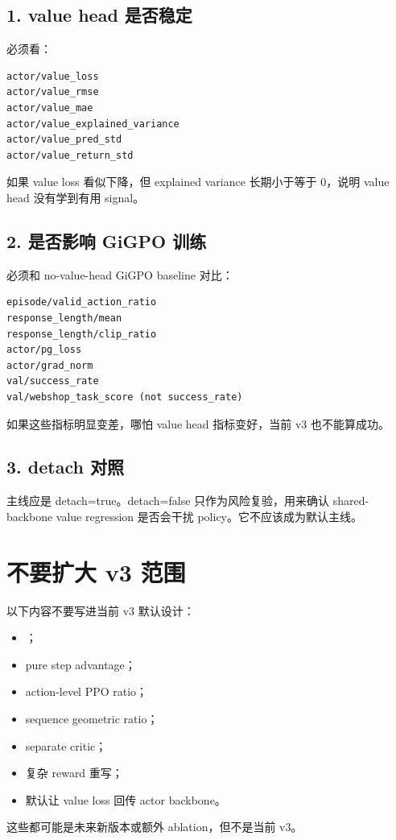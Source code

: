 \documentclass[10pt]{ctexart}
\begin{document}
\subsection*{1. value head 是否稳定}
必须看：
\begin{lstlisting}
actor/value_loss
actor/value_rmse
actor/value_mae
actor/value_explained_variance
actor/value_pred_std
actor/value_return_std
\end{lstlisting}

如果 value loss 看似下降，但 explained variance 长期小于等于 0，说明 value head 没有学到有用 signal。

\subsection*{2. 是否影响 GiGPO 训练}
必须和 no-value-head GiGPO baseline 对比：
\begin{lstlisting}
episode/valid_action_ratio
response_length/mean
response_length/clip_ratio
actor/pg_loss
actor/grad_norm
val/success_rate
val/webshop_task_score (not success_rate)
\end{lstlisting}

如果这些指标明显变差，哪怕 value head 指标变好，当前 v3 也不能算成功。

\subsection*{3. detach 对照}
主线应是 detach=true。detach=false 只作为风险复验，用来确认 shared-backbone value regression 是否会干扰 policy。它不应该成为默认主线。

\section*{不要扩大 v3 范围}
以下内容不要写进当前 v3 默认设计：
\begin{itemize}
  \item {}；
  \item pure step advantage；
  \item action-level PPO ratio；
  \item sequence geometric ratio；
  \item separate critic；
  \item 复杂 reward 重写；
  \item 默认让 value loss 回传 actor backbone。
\end{itemize}

这些都可能是未来新版本或额外 ablation，但不是当前 v3。
\end{document}
